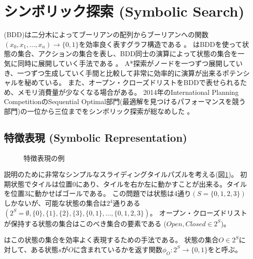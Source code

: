 \section{シンボリック探索 (Symbolic Search)}
\label{sec:symbolic-search}
 (BDD)は二分木によってブーリアンの配列からブーリアンへの関数$(x_0,x_1,...,x_n) \rightarrow \{0, 1\}$を効率良く表すグラフ構造である \cite{akers1978binary,bryant1992symbolic}。
はBDDを使って状態の集合、アクションの集合を表し、BDD同士の演算によって状態の集合を一気に同時に展開していく手法である \cite{edelkamp1998obdds,Edelkamp99deterministicstate}。
A*探索がノードを一つずつ展開していき、一つずつ生成していく手間と比較して非常に効率的に演算が出来るポテンシャルを秘めている。
また、オープン・クローズドリストをBDDで表せられるため、メモリ消費量が少なくなる場合がある。
2014年のInternational Planning CompetitionのSequential Optimal部門(最適解を見つけるパフォーマンスを競う部門)の一位から三位までをシンボリック探索が総なめした \cite{vallati20152014}。


\subsection{特徴表現 (Symbolic Representation)}
\label{sec:symbolic-representation}



\begin{figure}
  \centering
  \begin{tikzpicture}[scale=0.6]
    
  \end{tikzpicture}
\caption{特徴表現の例}
\label{fig:sliding-token}
\end{figure}


説明のために非常なシンプルなスライディングタイルパズルを考える(図\ref{fig:sliding-token})。
初期状態でタイルは位置0にあり、タイルを右か左に動かすことが出来る。タイルを位置3に動かせばゴールである。
この問題では状態は4通り$(S = \{0,1,2,3\})$しかないが、可能な状態の集合は$2^4$通りある $(2^S = \emptyset, \{0\}, \{1\}, \{2\}, \{3\}, \{0, 1\}, ..., \{0, 1, 2, 3\})$。
オープン・クローズドリストが保持する状態の集合はこのべき集合の要素である ($Open, Closed \in 2^S$)。

はこの状態の集合を効率よく表現するための手法である。
状態の集合$O \in 2^S$に対して、ある状態$s$が$O$に含まれているかを返す関数$\phi_{O}: 2^S \rightarrow \{0, 1\}$をと呼ぶ。

